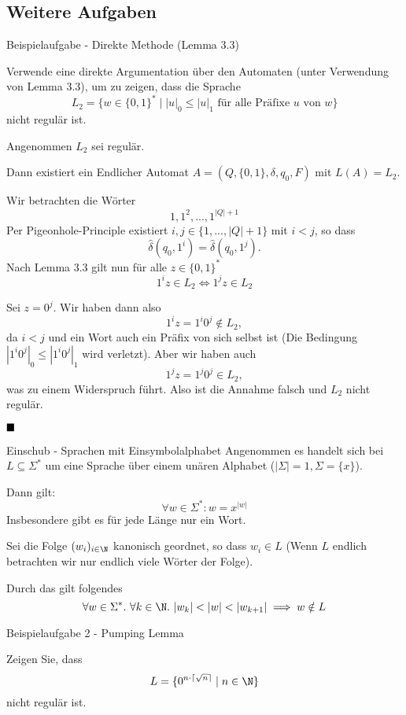 \subsection{Weitere Aufgaben}

    \begin{subbox}{Beispielaufgabe - Direkte Methode (Lemma 3.3)}

    Verwende eine direkte Argumentation über den Automaten (unter Verwendung von Lemma 3.3), um zu zeigen, dass die Sprache
    $$L_2 = \{w \in \{0,1\}^* \mid |u|_0 \leq |u|_1 \text{ für alle Präfixe }u \text{ von }w\}$$
    nicht regulär ist.
    \end{subbox}

    Angenommen $L_2$ sei regulär. 
    
    Dann existiert ein Endlicher Automat $A = (Q, \{0,1\}, \delta, q_0, F)$ mit $L(A) = L_2$. 
    
    Wir betrachten die Wörter
    $$1, 1^2, ..., 1^{|Q|+1}$$
    Per Pigeonhole-Principle existiert $i, j \in \{1, ..., |Q|+1\}$ mit $i < j$, so dass 
    $$\hat{\delta}(q_0, 1^i) = \hat{\delta}(q_0, 1^j).$$
    Nach Lemma 3.3 gilt nun für alle $z \in \{0,1\}^*$
    $$1^iz \in L_2 \iff 1^jz \in L_2$$

    Sei $z = 0^j$. Wir haben dann also 
    $$1^iz = 1^i0^j \notin L_2,$$
    da $i < j$ und ein Wort auch ein Präfix von sich selbst ist (Die Bedingung $|1^i0^j|_0 \leq |1^i0^j|_1$ wird verletzt).
    Aber wir haben auch
    $$1^jz = 1^j0^j \in L_2,$$
    was zu einem Widerspruch führt. Also ist die Annahme falsch und $L_2$ nicht regulär.

    $\hfill\blacksquare$

\begin{subbox}{Einschub - Sprachen mit Einsymbolalphabet}
    Angenommen es handelt sich bei $L \subseteq \Sigma^*$ um eine Sprache über einem unären Alphabet ($|\Sigma| = 1, \Sigma = \{x\}$).

    Dann gilt: $$\forall w \in \Sigma^*: w = x^{|w|}$$
    Insbesondere gibt es für jede Länge nur ein Wort. 
    
    Sei die Folge $(w_i)_{i \in \N}$ kanonisch geordnet, so dass $w_i \in L$ (Wenn $L$ endlich betrachten wir nur endlich viele Wörter der Folge).
    
    Durch das gilt folgendes
    $$\forall w \in \Sigma^*. \ \forall k \in \N. \ |w_k| < |w| < |w_{k+1}| \implies w \notin L$$
\end{subbox}


    \begin{subbox}{Beispielaufgabe 2 - Pumping Lemma}

    Zeigen Sie, dass 
    $$L = \{0^{n\cdot \lceil \sqrt{n}\rceil} \mid n \in \N\}$$ 
    nicht regulär ist.
    \end{subbox}

